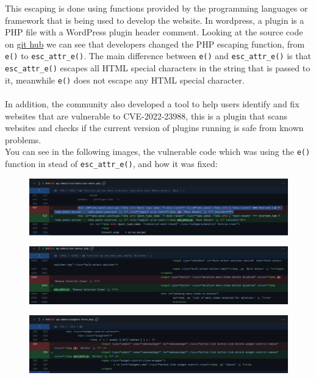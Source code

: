 \documentclass{article}
\begin{document}
	This escaping is done using functions provided by the programming languages or framework that is being used to develop the website. In wordpress, a plugin is a PHP file with a WordPress plugin header comment. Looking at the source code on \href{https://github.com/WordPress/WordPress/commit/948a260e805f11709cd38bf305a3092070ec7f66}{git hub} we can see that developers changed the PHP escaping function, from \verb|e()| to \verb|esc_attr_e()|. The main difference between \verb|e()| and \verb|esc_attr_e()| is that \verb|esc_attr_e()| escapes all HTML special characters in the string that is passed to it, meanwhile \verb|e()| does not escape any HTML special character. \\ \\
	In addition, the community also developed a tool to help users identify and fix websites that are vulnerable to CVE-2022-23988, this is a plugin that scans websites and checks if the current version of plugins running is safe from known problems. \\
	
	You can see in the following images, the vulnerable code which was using the \verb|e()| function in stead of \verb|esc_attr_e()|, and how it was fixed:
	
	\begin{figure}[htbp]
    \centering
    \includegraphics[width=1\textwidth]{1} 
	\end{figure} 
	\begin{figure}[htbp]
    \centering
    \includegraphics[width=1\textwidth]{2} 
	\end{figure}
	\begin{figure}[htbp]
    \centering
    \includegraphics[width=1\textwidth]{3} 
	\end{figure} 
	
	\newpage
	 

	
\end{document}
